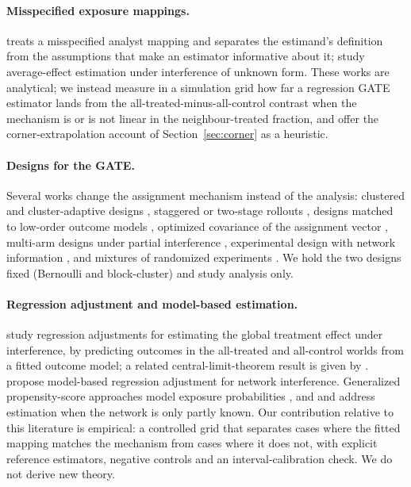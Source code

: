 \documentclass{article}
\begin{document}
\paragraph{Misspecified exposure mappings.} \citet{Savje2023Misspecified} treats a misspecified analyst mapping and separates the estimand's definition from the assumptions that make an estimator informative about it; \citet{Savje2021Unknown} study average-effect estimation under interference of unknown form. These works are analytical; we instead measure in a simulation grid how far a regression GATE estimator lands from the all-treated-minus-all-control contrast when the mechanism is or is not linear in the neighbour-treated fraction, and offer the corner-extrapolation account of Section~\ref{sec:corner} as a heuristic.

\paragraph{Designs for the GATE.} Several works change the assignment mechanism instead of the analysis: clustered and cluster-adaptive designs \citep{Viviano2023CausalClustering,Zhou2020ClusterAdaptive,Nandy2019Dense}, staggered or two-stage rollouts \citep{Cortez2024TwoStage}, designs matched to low-order outcome models \citep{Eichhorn2024LoworderOA}, optimized covariance of the assignment vector \citep{Chen2023OptimizedCD}, multi-arm designs under partial interference \citep{Offer-Westort2021DesigningME}, experimental design with network information \citep{Viviano2020Experimental}, and mixtures of randomized experiments \citep{Jiang2023Mixture}. We hold the two designs fixed (Bernoulli and block-cluster) and study analysis only.

\paragraph{Regression adjustment and model-based estimation.} \citet{Chin2018RegressionAF} study regression adjustments for estimating the global treatment effect under interference, by predicting outcomes in the all-treated and all-control worlds from a fitted outcome model; a related central-limit-theorem result is given by \citet{Chin2018Stein}. \citet{Han2023ModelbasedRA} propose model-based regression adjustment for network interference. Generalized propensity-score approaches model exposure probabilities \citep{Forastiere2022EstimatingCE}, and \citet{Shankar2024ABTU} and \citet{Bhattacharya2019Uncertainty} address estimation when the network is only partly known. Our contribution relative to this literature is empirical: a controlled grid that separates cases where the fitted mapping matches the mechanism from cases where it does not, with explicit reference estimators, negative controls and an interval-calibration check. We do not derive new theory.
\end{document}
